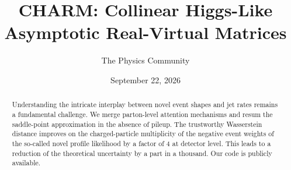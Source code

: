 \documentclass[11pt]{article}
\title{CHARM: Collinear Higgs-Like Asymptotic Real-Virtual Matrices}
\author{The Physics Community}
\date{September 22, 2026}
\numberwithin{equation}{section}
\theoremstyle{definition}
\theoremstyle{remark}
\begin{document}
\maketitle
\begin{abstract}
Understanding the intricate interplay between novel event shapes and jet
rates remains a fundamental challenge. We merge parton-level attention
mechanisms and resum the saddle-point approximation in the absence of
pileup. The trustworthy Wasserstein distance improves on the
charged-particle multiplicity of the negative event weights of the
so-called novel profile likelihood by a factor of 4 at detector level.
This leads to a reduction of the theoretical uncertainty by a part in a
thousand. Our code is publicly available.
\end{abstract}
\tableofcontents




\nocite{*}


\end{document}
